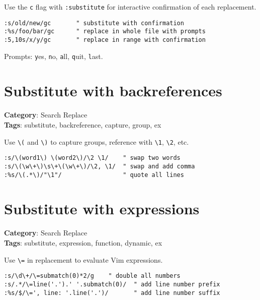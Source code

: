 {{{{{Use the {\footnotesize \Verb§c§} flag with {\footnotesize \Verb§:substitute§} for interactive confirmation of each replacement.

\begin{Exa*}{}
\begin{Verbatim}[fontsize=\footnotesize, breaklines, breakanywhere]
:s/old/new/gc       " substitute with confirmation
:%s/foo/bar/gc      " replace in whole file with prompts
:5,10s/x/y/gc       " replace in range with confirmation
\end{Verbatim}
\end{Exa*}

Prompts: {\footnotesize \Verb§y§}es, {\footnotesize \Verb§n§}o, {\footnotesize \Verb§a§}ll, {\footnotesize \Verb§q§}uit, {\footnotesize \Verb§l§}ast.

\section{Substitute with backreferences}

\textbf{Category}: Search Replace\\ \textbf{Tags}: substitute, backreference, capture, group, ex
\vspace{0.5cm}

Use {\footnotesize \Verb§\(§} and {\footnotesize \Verb§\)§} to capture groups, reference with {\footnotesize \Verb§\1§}, {\footnotesize \Verb§\2§}, etc.

\begin{Exa*}{}
\begin{Verbatim}[fontsize=\footnotesize, breaklines, breakanywhere]
:s/\(word1\) \(word2\)/\2 \1/    " swap two words
:s/\(\w\+\)\s\+\(\w\+\)/\2, \1/  " swap and add comma
:%s/\(.*\)/"\1"/                 " quote all lines
\end{Verbatim}
\end{Exa*}

\section{Substitute with expressions}

\textbf{Category}: Search Replace\\ \textbf{Tags}: substitute, expression, function, dynamic, ex
\vspace{0.5cm}

Use {\footnotesize \Verb§\=§} in replacement to evaluate Vim expressions.

\begin{Exa*}{}
\begin{Verbatim}[fontsize=\footnotesize, breaklines, breakanywhere]
:s/\d\+/\=submatch(0)*2/g    " double all numbers
:s/.*/\=line('.').' '.submatch(0)/  " add line number prefix
:%s/$/\=', line: '.line('.')/       " add line number suffix
\end{Verbatim}
\end{Exa*}

}}}}}

